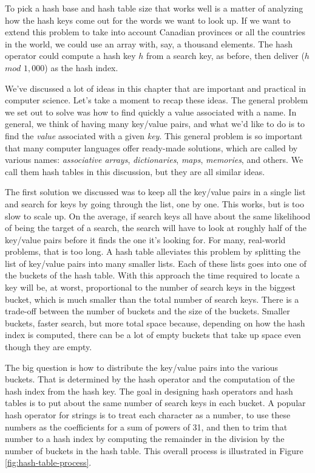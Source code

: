 To pick a hash base and hash table size
that works well is a matter of analyzing how
the hash keys come out for the words we want to look up.
If we want to extend this problem to take into
account Canadian provinces or all the countries in the world, we could
use an array with, say, a thousand elements.
The hash operator could compute a hash key $h$ from a search key,
as before, then deliver ($h$ $mod$ $1,000$) as the hash index.

We've discussed a lot of ideas in this chapter
that are important and practical in computer science.
Let's take a moment to recap these ideas.
The general problem we set out to solve was how to find quickly a value
associated with a name. In general, we think of having many key/value pairs,
and what we'd like to do is to find the \emph{value} associated with a given
\emph{key}. This general problem is so important that many computer languages
offer ready-made solutions, which are called by
various names: \emph{associative arrays}, \emph{dictionaries},
\emph{maps}, \emph{memories}, and others.
We call them hash tables in this discussion,
but they are all similar ideas.

The first solution we discussed was
to keep all the key/value pairs in a single list
and search for keys by going through the list, one by one.
This works, but is too slow to scale up.
On the average, if search keys all have about the same likelihood of
being the target of a search,
the search will have to look at roughly half
of the key/value pairs before it finds the one it's looking for. %
For many, real-world problems, that is too long.
A hash table alleviates this problem
by splitting the list of key/value pairs into many smaller lists.
Each of these lists goes into one of the buckets of the hash table.
With this approach the time required to locate a key
will be, at worst, proportional
to the number of search keys in the biggest bucket,
which is much smaller than the total number of search keys.
There is a trade-off between the number of buckets and the size of the buckets.
Smaller buckets, faster search, but more total space because,
depending on how the hash index is computed,
there can be a lot of empty buckets
that take up space even though they are empty.

The big question is how to distribute the key/value pairs into the various buckets.
That is determined by the hash operator and
the computation of the hash index from the hash key.
The goal in designing hash operators and hash tables
is to put about the same number of search keys in each bucket.
A popular hash operator for
strings is to treat each character as a number, to use these numbers as the
coefficients for a sum of powers of 31, and then to trim that number to
a hash index by computing the remainder in the division by
the number of buckets in the hash table.
This overall process is illustrated in Figure \ref{fig:hash-table-process}.

